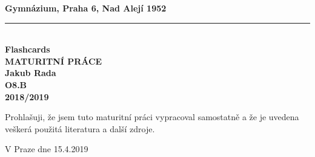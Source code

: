 \begin{titlepage}
    \begin{center}
        \vspace*{1cm}
        \textbf{\large Gymnázium, Praha 6, Nad Alejí 1952}\\
        \vspace{0.2cm}
        \rule{\textwidth}{0.5pt}\\
        \vspace{5cm}
        \textbf{\Huge Flashcards}\\
        \vspace{5cm}
        \textbf{\large MATURITNÍ PRÁCE}\\
        \vspace{2cm}
        \textbf{\large Jakub Rada}\\
        \textbf{O8.B}\\
        \vspace*{\fill}
        \textbf{\large 2018/2019}\\
    \end{center}
\end{titlepage}
\newpage
\vspace*{5cm}
Prohlašuji, že jsem tuto maturitní práci vypracoval samostatně a že je uvedena veškerá použitá literatura a další zdroje.\newline
\begin{minipage}{0.7\textwidth}
    \vspace{1cm}
    V Praze dne 15.4.2019
\end{minipage}
\begin{minipage}{0.3\textwidth}
    \vspace{1cm}
    \begin{flushright}
        \vspace{11pt}
        \hrulefill
    \end{flushright}
\end{minipage}
